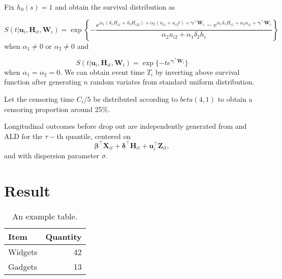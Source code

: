 \documentclass{article}
\begin{document}
Fix $h_0(s)=1$ and obtain the survival distribution as 

\[S(t|\boldsymbol{u}_i, {\boldsymbol H}_{it}, {\boldsymbol W}_i)=\exp\left\{-\frac{e^{\alpha_1(\delta_1H_{i1}+\delta_2H_{i2t}) + \alpha_2(u_{i1}+u_{i2}t) + \boldsymbol{\gamma}^{\top}\boldsymbol{W}_i} - e^{\alpha_1\delta_1H_{i1}+\alpha_2u_{i1} + \boldsymbol{\gamma}^{\top}\boldsymbol{W}_i}}{\alpha_2u_{i2}+\alpha_1\delta_2h_i}\right\}\] when $\alpha_1\ne0$ or $\alpha_2\ne0$ and 

\[S(t|\boldsymbol{u}_i, {\boldsymbol H}_{it}, {\boldsymbol W}_i) =  \exp\{-te^{\boldsymbol{\gamma}^{\top}\boldsymbol{W}_i}\}\]
when $\alpha_1=\alpha_2=0.$ We can obtain event time $T_i$ by inverting above survival function after generating $n$ random variates from standard uniform distribution.\par

Let the censoring time $C_i/5$ be distributed according to $beta(4,1)$ to obtain a censoring proportion around 25\%. \par

Longitudinal outcomes before drop out are independently generated from and ALD for the $\tau-$th quantile, centered on 
\[\boldsymbol{\beta}^{\top}{\boldsymbol X}_{it} + \boldsymbol{\delta}^{\top}{\boldsymbol H}_{it} + {\boldsymbol u}_i^{\top}{\boldsymbol Z}_{it},\] and with dispersion parameter $\sigma$.




\section{Result}
\begin{table}[H]
\centering
\begin{tabular}{l|r}
Item & Quantity \\\hline
Widgets & 42 \\
Gadgets & 13
\end{tabular}
\caption{\label{tab:widgets}An example table.}
\end{table}

























%
%
%
%

\end{document}
